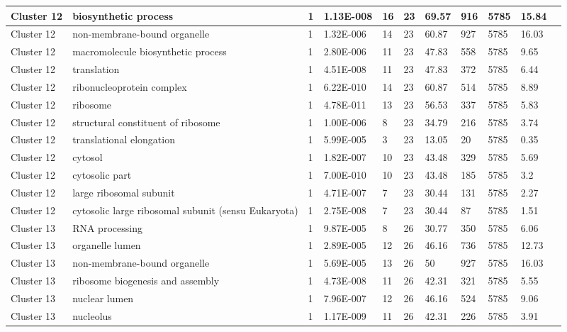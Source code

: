 \begin{tabular}{|l|l|l|l|l|l|l|l|l|l|l|}
\hline
Cluster 12&biosynthetic process&1&1.13E-008&16&23&69.57&916&5785&15.84&\\
\hline
Cluster 12&non-membrane-bound organelle&1&1.32E-006&14&23&60.87&927&5785&16.03&\\
\hline
Cluster 12&macromolecule biosynthetic process&1&2.80E-006&11&23&47.83&558&5785&9.65&\\
\hline
Cluster 12&translation&1&4.51E-008&11&23&47.83&372&5785&6.44&\\
\hline
Cluster 12&ribonucleoprotein complex&1&6.22E-010&14&23&60.87&514&5785&8.89&\\
\hline
Cluster 12&ribosome&1&4.78E-011&13&23&56.53&337&5785&5.83&\\
\hline
Cluster 12&structural constituent of ribosome&1&1.00E-006&8&23&34.79&216&5785&3.74&\\
\hline
Cluster 12&translational elongation&1&5.99E-005&3&23&13.05&20&5785&0.35&\\
\hline
Cluster 12&cytosol&1&1.82E-007&10&23&43.48&329&5785&5.69&\\
\hline
Cluster 12&cytosolic part&1&7.00E-010&10&23&43.48&185&5785&3.2&\\
\hline
Cluster 12&large ribosomal subunit&1&4.71E-007&7&23&30.44&131&5785&2.27&\\
\hline
Cluster 12&cytosolic large ribosomal subunit (sensu Eukaryota)&1&2.75E-008&7&23&30.44&87&5785&1.51&\\
\hline
Cluster 13&RNA processing&1&9.87E-005&8&26&30.77&350&5785&6.06&\\
\hline
Cluster 13&organelle lumen&1&2.89E-005&12&26&46.16&736&5785&12.73&\\
\hline
Cluster 13&non-membrane-bound organelle&1&5.69E-005&13&26&50&927&5785&16.03&\\
\hline
Cluster 13&ribosome biogenesis and assembly&1&4.73E-008&11&26&42.31&321&5785&5.55&\\
\hline
Cluster 13&nuclear lumen&1&7.96E-007&12&26&46.16&524&5785&9.06&\\
\hline
Cluster 13&nucleolus&1&1.17E-009&11&26&42.31&226&5785&3.91&\\
\hline
\end{tabular}
